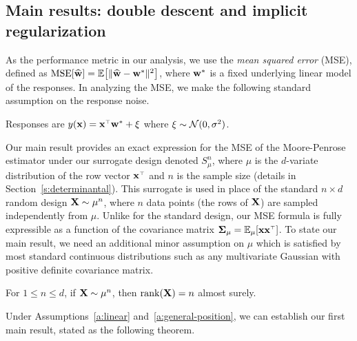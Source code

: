 \documentclass[11pt]{article}
\begin{document}
\subsection{Main results: double descent and implicit regularization}

As the performance metric in our analysis, we use the \emph{mean
  squared error} (MSE), defined as
$\mathrm{MSE}[\widehat{\mathbf w}]=\mathbb E\big[\|\widehat{\mathbf w}-\mathbf w^*\|^2\big]$, where $\mathbf w^*$ is a fixed
underlying linear model of the responses.  
In analyzing the MSE, we make the following standard assumption on the response noise.
\begin{assumption}\label{a:linear}
  Responses are $y(\x) = \x^\top\w^*+\xi$ where
$\xi\sim\mathcal{N}(0,\sigma^2)$.
\end{assumption}

\noindent
Our main result provides an exact expression for the MSE of the
Moore-Penrose estimator under our surrogate design denoted $S_\mu^n$, where
$\mu$ is the $d$-variate distribution of the row vector $\x^\top$ and $n$ is the sample
size (details in Section~\ref{s:determinantal}). This surrogate is
used in place of the standard $n\times d$ random design $\mathbf X\sim\mu^n$, where $n$
data points (the rows of $\mathbf X$) are sampled independently from
$\mu$. Unlike for the standard design, our MSE formula is
fully expressible as a function of the covariance
matrix $\Sigmab_\mu=\E_\mu[\x\x^\top]$. To state our main result, we
need an additional minor assumption on $\mu$ which is satisfied by
most standard continuous distributions such as any multivariate
Gaussian with positive definite covariance matrix. 
\begin{assumption}\label{a:general-position}
For $1\leq n \leq d$, if $\mathbf X\sim\mu^n$, then $\mathrm{rank}(\mathbf X)=n$ almost surely.
\end{assumption}

\noindent
Under Assumptions~\ref{a:linear} and~\ref{a:general-position}, we can establish our first main result, stated as the following theorem.
\end{document}
